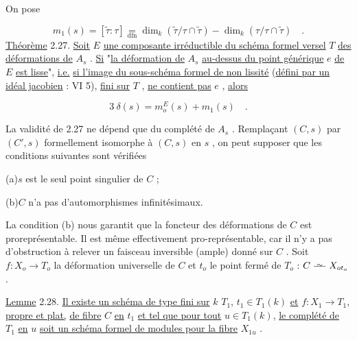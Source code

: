On pose

\begin{equation*}
m_{1}(s) = [\widetilde{\tau} : \tau] \mathop{=}\limits_{\mathrm{dfn}} \dim_{k}(\widetilde{\tau}/\tau \cap \widetilde{\tau}) - \dim_{k}(\tau/\tau\cap\widetilde{\tau}) \quad .
\end{equation*}
\underline{Théorème} 2.27.  \underline{Soit}  $E$  \underline{une composante irréductible du schéma formel versel}  $T$  \underline{des déformations de}  $A_{s}$ . \underline{Si}  "\underline{la déformation de}  $A_{s}$  \underline{au-dessus du point générique}  $e$  \underline{de}  $E$  \underline{est lisse}", \underline{i.e.} \underline{si l'image du sous-schéma formel de non lissité} (\underline{défini par un idéal jacobien} : VI 5), \underline{fini sur}  $T$ , \underline{ne contient pas}  $e$ , \underline{alors}

\begin{equation*}
3\ \delta(s) = m_{o}^{E}(s) + m_{1}(s) \quad .
\end{equation*}


La validité de 2.27 ne dépend que du complété de $A_s$ . Remplaçant $(C,s)$ par $(C',s)$ formellement isomorphe à $(C,s)$ en $s$ , on peut supposer que les conditions suivantes sont vérifiées

(a)\quad $s$ est le seul point singulier de $C$ ;

(b)\quad $C$ n'a pas d'automorphismes infinitésimaux.

La condition (b) nous garantit que la foncteur des déformations de $C$ est proreprésentable. Il est même effectivement pro-représentable, car il n'y a pas d'obstruction à relever un faisceau inversible (ample) donné sur $C$ . Soit $f : X_o \longrightarrow T_o$ la déformation universelle de $C$ et $t_o$ le point fermé de $T_o$ : $C \stackrel{\sim}{\relbar\joinrel\relbar} X_{ot_o}$.

\underline{Lemme} 2.28. \quad \underline{Il existe un schéma de type fini sur} $k$ $T_1$, $t_1 \in T_1(k)$ \underline{et} $f : X_1 \longrightarrow T_1$, \underline{propre et plat,} \underline{de fibre} $C$ \underline{en} $t_1$ \underline{et tel que pour tout} $u \in T_1(k)$, \underline{le complété de} $T_1$ \underline{en} $u$ \underline{soit un schéma formel de modules pour la fibre} $X_{1u}$ .

